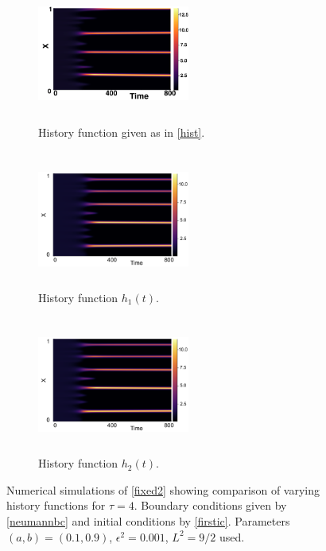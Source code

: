 \begin{figure}[H]
    \centering
    \begin{subfigure}[t]{0.32\textwidth}
        \centering
        \includegraphics[width=5cm,height=4.5cm]{ic24.png}
        \caption{History function given as in \eqref{hist}.}
        \label{}
    \end{subfigure}
    \hfill
    \begin{subfigure}[t]{0.32\textwidth}
        \centering
        \includegraphics[width=5cm,height=4.5cm]{h14.png}
        \caption{History function $h_1(t)$.}
        \label{}
    \end{subfigure}
    \hfill
    \begin{subfigure}[t]{0.32\textwidth}
        \centering
        \includegraphics[width=5cm,height=4.5cm]{h24.png}
        \caption{History function $h_2(t)$.}
        \label{}
    \end{subfigure}
    \caption{Numerical simulations of \eqref{fixed2} showing comparison of varying history functions for $\tau=4$. Boundary conditions given by \eqref{neumannbc} and initial conditions by \eqref{firstic}. Parameters $(a,b)=(0.1,0.9)$, $\epsilon^2=0.001$, $L^2=9/2$ used.}
    \label{fig:temp4}
\end{figure}

